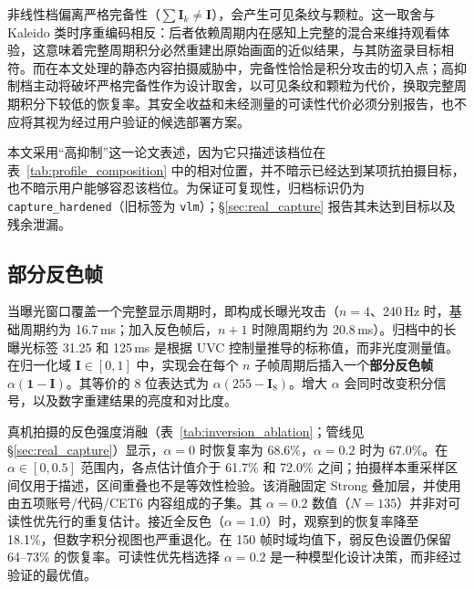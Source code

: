 非线性档偏离严格完备性（$\sum\mathbf{I}_k \neq \mathbf{I}$），会产生可见条纹与颗粒。这一取舍与 Kaleido 类时序重编码相反：后者依赖周期内在感知上完整的混合来维持观看体验，这意味着完整周期积分必然重建出原始画面的近似结果，与其防盗录目标相符。而在本文处理的静态内容拍摄威胁中，完备性恰恰是积分攻击的切入点；高抑制档主动将破坏严格完备性作为设计取舍，以可见条纹和颗粒为代价，换取完整周期积分下较低的恢复率。其安全收益和未经测量的可读性代价必须分别报告，也不应将其视为经过用户验证的候选部署方案。

本文采用“高抑制”这一论文表述，因为它只描述该档位在表~\ref{tab:profile_composition} 中的相对位置，并不暗示已经达到某项抗拍摄目标，也不暗示用户能够容忍该档位。为保证可复现性，归档标识仍为 \texttt{capture\_hardened}（旧标签为 \texttt{vlm}）；\S\ref{sec:real_capture} 报告其未达到目标以及残余泄漏。

\subsection{部分反色帧}

当曝光窗口覆盖一个完整显示周期时，即构成长曝光攻击（$n=4$、240\,Hz 时，基础周期约为 16.7\,ms；加入反色帧后，$n+1$ 时隙周期约为 20.8\,ms）。归档中的长曝光标签 31.25 和 125\,ms 是根据 UVC 控制量推导的标称值，而非光度测量值。在归一化域 $\mathbf{I}\in[0,1]$ 中，实现会在每个 $n$ 子帧周期后插入一个\textbf{部分反色帧} $\alpha(\mathbf{1}-\mathbf{I})$。其等价的 8 位表达式为 $\alpha(255-\mathbf{I}_{8})$。增大 $\alpha$ 会同时改变积分信号，以及数字重建结果的亮度和对比度。

真机拍摄的反色强度消融（表~\ref{tab:inversion_ablation}；管线见 \S\ref{sec:real_capture}）显示，$\alpha=0$ 时恢复率为 68.6\%，$\alpha=0.2$ 时为 67.0\%。在 $\alpha\in[0,0.5]$ 范围内，各点估计值介于 61.7\% 和 72.0\% 之间；拍摄样本重采样区间仅用于描述，区间重叠也不是等效性检验。该消融固定 Strong 叠加层，并使用由五项账号/代码/CET6 内容组成的子集。其 $\alpha=0.2$ 数值（$N=135$）并非对可读性优先行的重复估计。接近全反色（$\alpha=1.0$）时，观察到的恢复率降至 18.1\%，但数字积分视图也严重退化。在 150 帧时域均值下，弱反色设置仍保留 64--73\% 的恢复率。可读性优先档选择 $\alpha=0.2$ 是一种模型化设计决策，而非经过验证的最优值。


